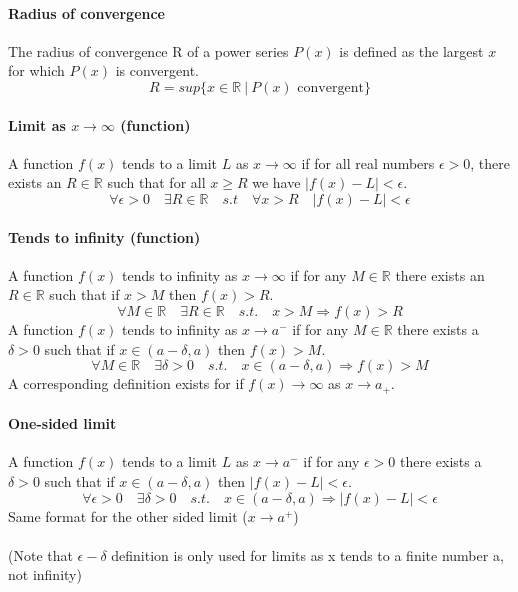 \documentclass{scrartcl}
\newcommand{\R}{\mathbb{R}}
\begin{document}
\paragraph{Radius of convergence}
The radius of convergence R of a power series $ P(x) $ is defined as the largest $ x $ for which $ P(x) $ is convergent.
\begin{equation}
R = sup\{x \in \R \ | \ P(x) \textrm{ convergent}\}
\end{equation}

\paragraph{Limit as $ x \to \infty $ (function)}
A function $ f(x) $ tends to a limit $ L $ as $ x \to \infty $ if for all real numbers $ \epsilon > 0 $, there exists an $ R \in \R $ such that for all $ x \geq R $ we have $ |f(x) - L| < \epsilon $.
\begin{equation}
\forall \epsilon > 0 \quad \exists R \in \R \quad s.t \quad \forall x > R \quad |f(x) - L| < \epsilon
\end{equation}

\paragraph{Tends to infinity (function)}
A function $ f(x) $ tends to infinity as $ x \to \infty $ if for any $ M \in \R $ there exists an $ R \in \R $ such that if $ x > M $ then $ f(x) > R $.
\begin{equation}
\forall M \in \R \quad \exists R \in \R \quad s.t. \quad x > M \Rightarrow f(x) > R
\end{equation}
A function $ f(x) $ tends to infinity as $ x \to a^{-} $ if for any $ M \in \R $ there exists a $ \delta > 0 $ such that if $ x \in (a - \delta, a) $ then $ f(x) > M $.
\begin{equation}
\forall M \in \R \quad \exists \delta > 0 \quad s.t. \quad x \in (a - \delta, a) \Rightarrow f(x) > M
\end{equation}
A corresponding definition exists for if $ f(x) \to \infty $ as $ x \to a_{+} $.

\paragraph{One-sided limit}
A function $ f(x) $ tends to a limit $ L $ as $ x \to a^{-} $ if for any $ \epsilon > 0 $ there exists a $ \delta > 0 $ such that if $ x \in (a - \delta, a) $ then $ |f(x) - L| < \epsilon $.
\begin{equation}
\forall \epsilon > 0 \quad \exists \delta > 0 \quad s.t. \quad x \in (a - \delta, a) \Rightarrow |f(x) - L| < \epsilon
\end{equation}
\noindent Same format for the other sided limit ($ x \to a^{+} $)
\\\\
(Note that $ \epsilon - \delta $ definition is only used for limits as x tends to a finite number a, not infinity)
\end{document}

